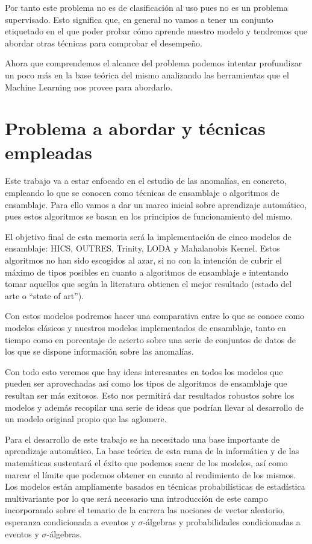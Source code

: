 Por tanto este problema no es de clasificación al uso pues no es un problema supervisado. Esto significa que, en general no vamos a tener un conjunto etiquetado en el que poder probar cómo aprende nuestro modelo y tendremos que abordar otras técnicas para comprobar el desempeño.

Ahora que comprendemos el alcance del problema podemos intentar profundizar un poco más en la base teórica del mismo analizando las herramientas que el Machine Learning nos provee para abordarlo.

\section{Problema a abordar y técnicas empleadas}

Este trabajo va a estar enfocado en el estudio de las anomalías, en concreto, empleando lo que se conocen como técnicas de ensamblaje o algoritmos de ensamblaje. Para ello vamos a dar un marco inicial sobre aprendizaje automático, pues estos algoritmos se basan en los principios de funcionamiento del mismo. 

El objetivo final de esta memoria será la implementación de cinco modelos de ensamblaje: HICS, OUTRES, Trinity, LODA y Mahalanobis Kernel. Estos algoritmos no han sido escogidos al azar, si no con la intención de cubrir el máximo de tipos posibles en cuanto a algoritmos de ensamblaje e intentando tomar aquellos que según la literatura obtienen el mejor resultado (estado del arte o ``state of art'').

Con estos modelos podremos hacer una comparativa entre lo que se conoce como modelos clásicos y nuestros modelos implementados de ensamblaje, tanto en tiempo como en porcentaje de acierto sobre una serie de conjuntos de datos de los que se dispone información sobre las anomalías.

Con todo esto veremos que hay ideas interesantes en todos los modelos que pueden ser aprovechadas así como los tipos de algoritmos de ensamblaje que resultan ser más exitosos. Esto nos permitirá dar resultados robustos sobre los modelos y además recopilar una serie de ideas que podrían llevar al desarrollo de un modelo original propio que las aglomere.

Para el desarrollo de este trabajo se ha necesitado una base importante de aprendizaje automático. La base teórica de esta rama de la informática y de las matemáticas sustentará el éxito que podemos sacar de los modelos, así como marcar el límite que podemos obtener en cuanto al rendimiento de los mismos. Los modelos están ampliamente basados en técnicas probabilísticas de estadística multivariante por lo que será necesario una introducción de este campo incorporando sobre el temario de la carrera las nociones de vector aleatorio, esperanza condicionada a eventos y $\sigma$-álgebras y probabilidades condicionadas a eventos y $\sigma$-álgebras.

